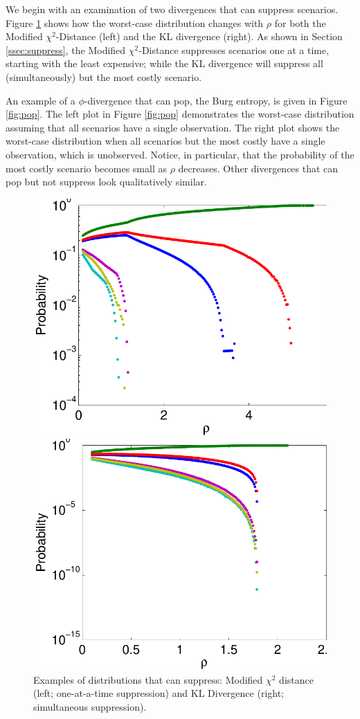 \documentclass[12pt]{article}
\theoremstyle{plain}
\theoremstyle{definition}
\theoremstyle{remark}
\begin{document}
We begin with an examination of two divergences that can suppress scenarios.
Figure \ref{fig:suppress} shows how the worst-case distribution changes with $\rho$ for both the Modified $\chi^2$-Distance (left) and the KL divergence (right).
As shown in Section \ref{ssec:suppress}, the Modified $\chi^2$-Distance suppresses scenarios one at a time, starting with the least expensive; while the KL divergence will suppress all (simultaneously) but the most costly scenario.

An example of a $\phi$-divergence that can pop, the Burg entropy, is given in Figure \ref{fig:pop}.
The left plot in Figure \ref{fig:pop} demonstrates the worst-case distribution assuming that all scenarios have a single observation.
The right plot shows the worst-case distribution when all scenarios but the most costly have a single observation, which is unobserved.
Notice, in particular, that the probability of the most costly scenario becomes small as $\rho$ decreases.
Other divergences that can pop but not suppress look qualitatively similar.

\begin{figure}
	\FIGURE
	{%
		\includegraphics*[width=.45\textwidth]{images/mchi2}%
		\includegraphics*[width=.45\textwidth]{images/kl}%
	}
	{
		Examples of distributions that can suppress: Modified $\chi^2$ distance (left; one-at-a-time suppression) and KL Divergence (right; simultaneous suppression).
		\label{fig:suppress}
	}
	{}
\end{figure}
\end{document}
